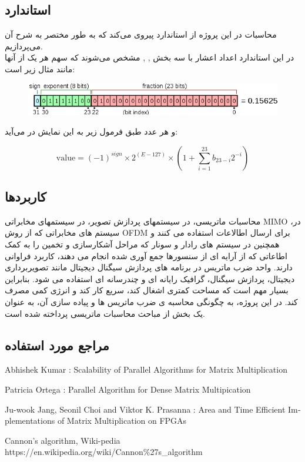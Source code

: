 \documentclass[12pt,onecolumn,a4paper,fleqn]{article}
\begin{document}
\subsection{استاندارد‌ }
محاسبات در این پروژه از استاندارد
 پیروی می‌کند که به طور مختصر به شرح آن می‌پردازیم. \\
 در این استاندارد اعداد اعشار با سه بخش  ,  ,  مشخص می‌شوند که سهم هر یک از آنها مانند مثال زیر است:
 
\begin{figure}[h]
	\centering
	\includegraphics[width=0.8\linewidth]{source/float_example.png}
\end{figure}

و هر عدد طبق فرمول زیر به این نمایش در می‌آید:

\begin{equation}
\text{value} = (-1)^{sign} \times 2^{(E-127)} \times (1 + \sum_{i=1}^{23}b_{23-i}2^{-i})
\end{equation}
\pagebreak
\subsection{کاربرد‌ها}
 
 محاسبات ماتریسی، در سیستمهای پردازش تصویر، در سیستمهای مخابراتی MIMO ،در سیستم های مخابراتی که از روش OFDM برای ارسال اطالاعات استفاده می کنند و همچنین در سیستم های رادار و سونار که مراحل آشکارسازی و تخمین را به کمک اطاعاتی که از آرایه ای از سنسورها جمع آوری شده انجام می دهند، کاربرد فراوانی دارند. 
 واحد ضرب ماتریس در برنامه های پردازش سیگنال دیجیتال مانند تصویربرداری دیجیتال، پردازش سیگنال، گرافیک رایانه ای و چندرسانه ای استفاده می شود. بنابراین بسیار مهم است که مساحت کمتری اشغال کند، سریع کار کند و انرژی کمی مصرف کند. 
 در این پروژه، به چگونگی محاسبه ی ضرب ماتریس ها و پیاده سازی آن، به عنوان یک بخش از مباحث محاسبات ماتریسی پرداخته شده است.

\subsection{مراجع مورد استفاده}

\begin{latin}
\begin{thebibliography}{}
	
	Abhishek Kumar : Scalability of Parallel Algorithms for Matrix Multiplication
	
	Patricia Ortega : Parallel Algorithm for Dense Matrix Multipication
	
	Ju-wook Jang, Seonil Choi and Viktor K. Prasanna : Area and Time Efficient Implementations of Matrix Multiplication on FPGAs
	
	Cannon's algorithm, Wiki-pedia\\ https://en.wikipedia.org/wiki/Cannon\%27s\_algorithm
	
	
\end{thebibliography}
\end{latin}
\end{document}
